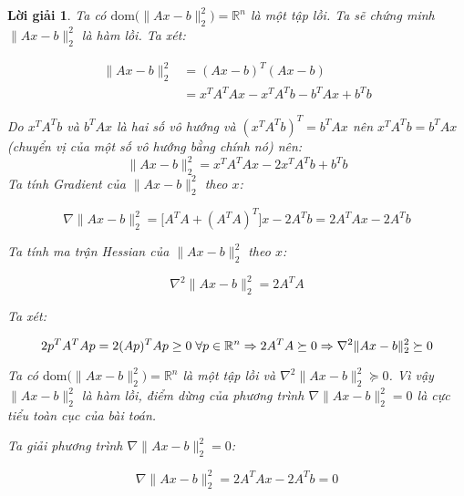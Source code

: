 \documentclass[14pt, a4paper]{article}
\theoremstyle{sltheorem}
\theoremstyle{soltheorem}
\newtheorem*{loigiai}{Lời giải}
\begin{document}
    \begin{loigiai}
        Ta có $\mathrm{dom}\Big( \lVert Ax-b \rVert_2^2\Big)=\mathbb{R}^{n}$ là một tập lồi. Ta sẽ chứng minh
        $\lVert Ax - b \rVert_2^2$ là hàm lồi. Ta xét:

        \begin{equation*}
            \begin{aligned}
            \lVert Ax - b \rVert_2^2&=(Ax-b)^T(Ax-b)\\
            &=x^TA^TAx - x^TA^Tb - b^TAx + b^Tb
            \end{aligned}
        \end{equation*}

        Do $x^TA^Tb$ và $b^TAx$ là hai số vô hướng và $(x^TA^Tb)^T=b^TAx$ nên $x^TA^Tb=b^TAx$ (chuyển vị của một số vô hướng bằng chính nó) nên:
        \begin{equation*}
            \lVert Ax - b \rVert_2^2=x^TA^TAx - 2x^TA^Tb + b^Tb
        \end{equation*}
        Ta tính Gradient của $\lVert Ax - b \rVert_2^2$ theo $x$:

        \begin{equation*}
            \nabla \lVert Ax - b \rVert_2^2=\Big\lbrack A^TA + (A^TA)^T \Big\rbrack x-2A^Tb=2A^TAx - 2A^Tb
        \end{equation*}

        Ta tính ma trận Hessian của $\lVert Ax - b \rVert_2^2$ theo $x$:

        \begin{equation*}
            \nabla^2 \lVert Ax - b \rVert_2^2=2A^TA
        \end{equation*}

        Ta xét:

        \begin{equation*}
            2p^TA^TAp=2(Ap)^TAp\geq0 \thickspace \forall p \in \mathbb{R}^{n} \Rightarrow 2A^TA \succeq 0 \Rightarrow \nabla^2 \lVert Ax - b \rVert_2^2 \succeq 0
        \end{equation*}

        Ta có $\mathrm{dom}\Big( \lVert Ax-b \rVert_2^2\Big)=\mathbb{R}^{n}$ là một tập lồi và $\nabla^2 \lVert Ax - b \rVert_2^2 \succeq 0$. Vì vậy $\lVert Ax - b \rVert_2^2$ là hàm lồi, điểm dừng của phương trình $\nabla \lVert Ax - b \rVert_2^2=0$ là cực tiểu toàn cục của bài toán.

        Ta giải phương trình $\nabla \lVert Ax - b \rVert_2^2=0$:

        \begin{equation*}
            \nabla \lVert Ax - b \rVert_2^2 = 2 A^T A x - 2 A^T b = 0
        \end{equation*}


\end{loigiai}
\end{document}
